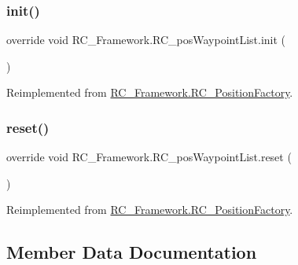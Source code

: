 \subsubsection{\texorpdfstring{init()}{init()}}
{\footnotesize\ttfamily override void R\+C\+\_\+\+Framework.\+R\+C\+\_\+pos\+Waypoint\+List.\+init (\begin{DoxyParamCaption}{ }\end{DoxyParamCaption})\hspace{0.3cm}{\ttfamily [virtual]}}



Reimplemented from \mbox{\hyperlink{class_r_c___framework_1_1_r_c___position_factory_af966db836e692a5a485531d227caa944}{R\+C\+\_\+\+Framework.\+R\+C\+\_\+\+Position\+Factory}}.

\mbox{\label{class_r_c___framework_1_1_r_c__pos_waypoint_list_acb5b5300a57cd6fc7c24db08bb27cdbf}} 
\subsubsection{\texorpdfstring{reset()}{reset()}}
{\footnotesize\ttfamily override void R\+C\+\_\+\+Framework.\+R\+C\+\_\+pos\+Waypoint\+List.\+reset (\begin{DoxyParamCaption}{ }\end{DoxyParamCaption})\hspace{0.3cm}{\ttfamily [virtual]}}



Reimplemented from \mbox{\hyperlink{class_r_c___framework_1_1_r_c___position_factory_a582a8b01a360280d67b199b1190d96f7}{R\+C\+\_\+\+Framework.\+R\+C\+\_\+\+Position\+Factory}}.



\subsection{Member Data Documentation}
\mbox{\label{class_r_c___framework_1_1_r_c__pos_waypoint_list_a395db5f819084204a145fe2816b4937e}} 
